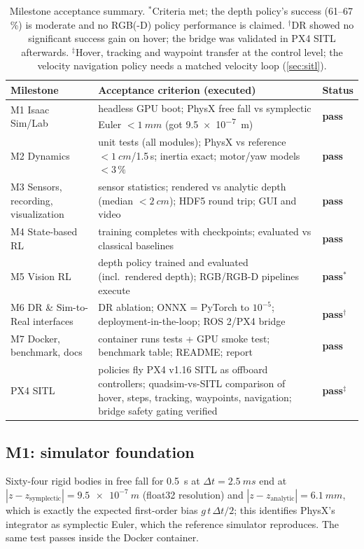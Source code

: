 \documentclass[11pt,a4paper]{article}
\newcommand{\ok}{\textcolor{green!50!black}{\textbf{pass}}}
\begin{document}
\begin{table}[h]
\centering\small
\begin{tabularx}{\linewidth}{lXl}
\toprule
Milestone & Acceptance criterion (executed) & Status\\\midrule
M1 Isaac Sim/Lab & headless GPU boot; PhysX free fall vs symplectic Euler $<\SI{1}{mm}$ (got \SI{9.5e-7}{m}) & \ok\\
M2 Dynamics & unit tests (all modules); PhysX vs reference $<\SI{1}{cm}$/1.5\,s; inertia exact; motor/yaw models $<3\,\%$ & \ok\\
M3 Sensors, recording, visualization & sensor statistics; rendered vs analytic depth (median $<\SI{2}{cm}$); HDF5 round trip; GUI and video & \ok\\
M4 State-based RL & training completes with checkpoints; evaluated vs classical baselines & \ok\\
M5 Vision RL & depth policy trained and evaluated (incl.\ rendered depth); RGB/RGB-D pipelines execute & \ok$^*$\\
M6 DR \& Sim-to-Real interfaces & DR ablation; ONNX = PyTorch to $10^{-5}$; deployment-in-the-loop; ROS 2/PX4 bridge & \ok$^\dagger$\\
M7 Docker, benchmark, docs & container runs tests + GPU smoke test; benchmark table; README; report & \ok\\
PX4 SITL & policies fly PX4 v1.16 SITL as offboard controllers; quadsim-vs-SITL comparison of hover, steps, tracking,
waypoints, navigation; bridge safety gating verified & \ok$^\ddagger$\\
\bottomrule
\end{tabularx}
\caption{Milestone acceptance summary. $^*$Criteria met; the depth policy's success (61--67\,\%) is moderate and
no RGB(-D) policy performance is claimed. $^\dagger$DR showed no significant success gain on hover; the bridge was
validated in PX4 SITL afterwards. $^\ddagger$Hover, tracking and waypoint transfer at the control level; the velocity
navigation policy needs a matched velocity loop (\cref{sec:sitl}).}
\label{tab:milestones}
\end{table}

\subsection{M1: simulator foundation}
Sixty-four rigid bodies in free fall for \SI{0.5}{s} at $\Delta t=\SI{2.5}{ms}$ end at
$|z-z_{\mathrm{symplectic}}|=\SI{9.5e-7}{m}$ (float32 resolution) and $|z-z_{\mathrm{analytic}}|=\SI{6.1}{mm}$, which is exactly the
expected first-order bias $g\,t\,\Delta t/2$; this identifies PhysX's integrator as symplectic Euler, which the reference
simulator reproduces. The same test passes inside the Docker container.
\end{document}
